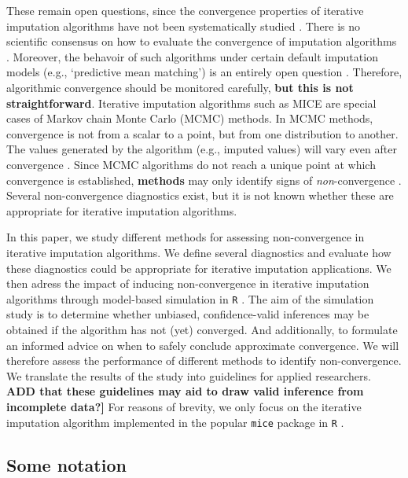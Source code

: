\documentclass[Royal,times,sageh]{sagej}
\begin{document}
These remain open questions, since the convergence properties of iterative imputation algorithms have not been systematically studied \citep{buur18}. There is no scientific consensus on how to evaluate the convergence of imputation algorithms \citep{taka17}. Moreover, the behavoir of such algorithms under certain default imputation models (e.g., `predictive mean matching') is an entirely open question \citep{murr18}. Therefore, algorithmic convergence should be monitored carefully, \textbf{but this is not straightforward}. Iterative imputation algorithms such as MICE are special cases of Markov chain Monte Carlo (MCMC) methods. In MCMC methods, convergence is not from a scalar to a point, but from one distribution to another. The values generated by the algorithm (e.g., imputed values) will vary even after convergence \citep{gelm13}. Since MCMC algorithms do not reach a unique point at which convergence is established, \textbf{methods} may only identify signs of \emph{non}-convergence \citep{hoff09}. Several non-convergence diagnostics exist, but it is not known whether these are appropriate for iterative imputation algorithms.

In this paper, we study different methods for assessing non-convergence in iterative imputation algorithms. We define several diagnostics and evaluate how these diagnostics could be appropriate for iterative imputation applications. We then adress the impact of inducing non-convergence in iterative imputation algorithms through model-based simulation in \texttt{R} \citep{R}. The aim of the simulation study is to determine whether unbiased, confidence-valid inferences may be obtained if the algorithm has not (yet) converged. And additionally, to formulate an informed advice on when to safely conclude approximate convergence. We will therefore assess the performance of different methods to identify non-convergence. We translate the results of the study into guidelines for applied researchers. \textbf{ADD that these guidelines may aid to draw valid inference from incomplete data?{]}} For reasons of brevity, we only focus on the iterative imputation algorithm implemented in the popular \texttt{mice} package \citep{mice} in \texttt{R} \citep{R}.

\hypertarget{some-notation}{%
\subsection{Some notation}\label{some-notation}}
\end{document}
